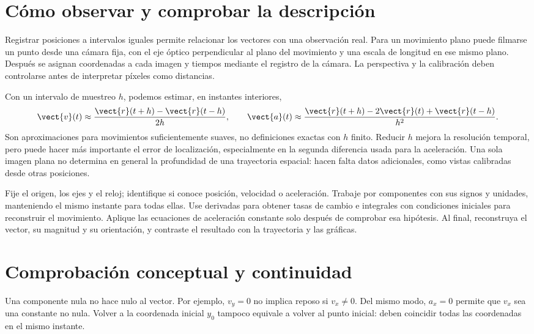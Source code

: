 \section{Cómo observar y comprobar la descripción}

Registrar posiciones a intervalos iguales permite relacionar los vectores
con una observación real. Para un movimiento plano puede filmarse un punto
desde una cámara fija, con el eje óptico perpendicular al plano del
movimiento y una escala de longitud en ese mismo plano. Después se asignan
coordenadas a cada imagen y tiempos mediante el registro de la cámara.
La perspectiva y la calibración deben controlarse antes de interpretar
píxeles como distancias.

Con un intervalo de muestreo \(h\), podemos estimar, en instantes interiores,
\[ \vect{v}(t)\approx\frac{\vect{r}(t+h)-\vect{r}(t-h)}{2h},\qquad
\vect{a}(t)\approx\frac{\vect{r}(t+h)-2\vect{r}(t)+\vect{r}(t-h)}{h^2}. \]
Son aproximaciones para movimientos suficientemente suaves, no definiciones
exactas con \(h\) finito. Reducir \(h\) mejora la resolución temporal,
pero puede hacer más importante el error de localización, especialmente
en la segunda diferencia usada para la aceleración. Una sola imagen plana
no determina en general la profundidad de una trayectoria espacial: hacen
falta datos adicionales, como vistas calibradas desde otras posiciones.

\begin{estrategia}
Fije el origen, los ejes y el reloj; identifique si conoce posición,
velocidad o aceleración. Trabaje por componentes con sus signos y unidades,
manteniendo el mismo instante para todas ellas. Use derivadas para obtener
tasas de cambio e integrales con condiciones iniciales para reconstruir el
movimiento. Aplique las ecuaciones de aceleración constante solo después
de comprobar esa hipótesis. Al final, reconstruya el vector, su magnitud
y su orientación, y contraste el resultado con la trayectoria y las gráficas.
\end{estrategia}

\section{Comprobación conceptual y continuidad}

\begin{errorfrecuente}
Una componente nula no hace nulo al vector. Por ejemplo, \(v_y=0\) no
implica reposo si \(v_x\ne0\). Del mismo modo, \(a_x=0\) permite que
\(v_x\) sea una constante no nula. Volver a la coordenada inicial
\(y_0\) tampoco equivale a volver al punto inicial: deben coincidir
todas las coordenadas en el mismo instante.
\end{errorfrecuente}

